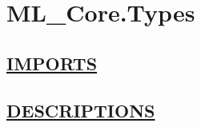 \chapter*{ML\_Core.Types}
\hypertarget{ecldoc:toc:ML_Core.Types}{}

\section*{\underline{IMPORTS}}

\section*{\underline{DESCRIPTIONS}}
